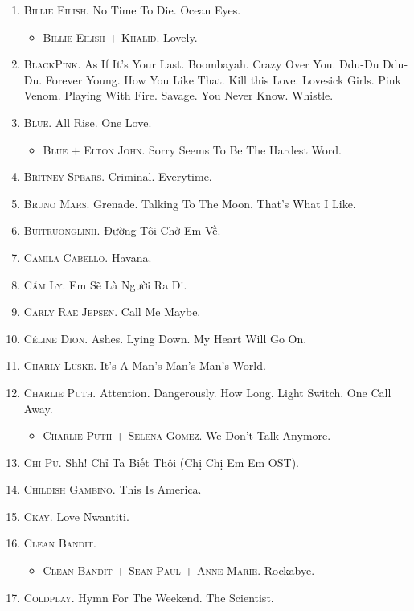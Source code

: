 \documentclass[oneside]{book}
\numberwithin{equation}{section}
\begin{document}
\begin{enumerate}
	\item \textsc{Billie Eilish.} No Time To Die. Ocean Eyes.
	\begin{itemize}
		\item \textsc{Billie Eilish $+$ Khalid.} Lovely.
	\end{itemize}
	\item \textsc{BlackPink.} As If It's Your Last. Boombayah. Crazy Over You. Ddu-Du Ddu-Du. Forever Young. How You Like That. Kill this Love. Lovesick Girls. Pink Venom. Playing With Fire. Savage. You Never Know. Whistle.
	\item \textsc{Blue.} All Rise. One Love.
	\begin{itemize}
		\item \textsc{Blue $+$ Elton John.} Sorry Seems To Be The Hardest Word.
	\end{itemize}
	\item \textsc{Britney Spears.} Criminal. Everytime.
	\item \textsc{Bruno Mars.} Grenade. Talking To The Moon. That's What I Like.
	\item \textsc{Buitruonglinh.} Đường Tôi Chở Em Về.
	\item \textsc{Camila Cabello.} Havana.
	\item \textsc{Cẩm Ly.} Em Sẽ Là Người Ra Đi.
	\item \textsc{Carly Rae Jepsen.} Call Me Maybe.
	\item \textsc{C\'eline Dion.} Ashes. Lying Down. My Heart Will Go On.
	\item \textsc{Charly Luske.} It's A Man's Man's Man's World.
	\item \textsc{Charlie Puth.} Attention. Dangerously. How Long. Light Switch. One Call Away.
	\begin{itemize}
		\item \textsc{Charlie Puth $+$ Selena Gomez.} We Don't Talk Anymore.
	\end{itemize}
	\item \textsc{Chi Pu.} Shh! Chỉ Ta Biết Thôi (Chị Chị Em Em OST).
	\item \textsc{Childish Gambino.} This Is America.
	\item \textsc{Ckay.} Love Nwantiti.
	\item \textsc{Clean Bandit.}
	\begin{itemize}
		\item \textsc{Clean Bandit $+$ Sean Paul $+$ Anne-Marie.} Rockabye.
	\end{itemize}
	\item \textsc{Coldplay.} Hymn For The Weekend. The Scientist.

\end{enumerate}
\end{document}
